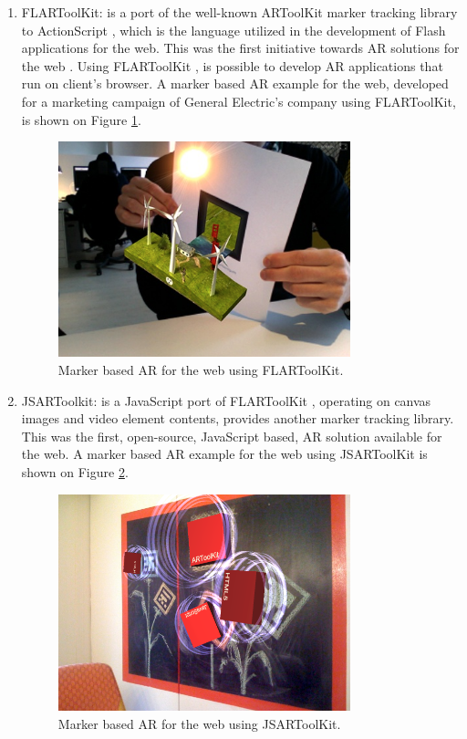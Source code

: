 \begin{enumerate}
    \item FLARToolKit: is a port of the well-known ARToolKit \cite{Hirokazu2002} marker tracking library to ActionScript \cite{Flash2013}, which is the language utilized in the development of Flash applications for the web. This was the first initiative towards AR solutions for the web \cite{Pablo2013}. Using FLARToolKit \cite{Yan2011}, is possible to develop AR applications that run on client's browser. A marker based AR example for the web, developed for a marketing campaign of General Electric's company using FLARToolKit, is shown on Figure \ref{figure:flartoolkit}.

    \begin{figure}[!htb]
      \centering
      \includegraphics[width=240pt]{chapters/tracking_library_for_the_web/flartoolkit.png}
      \caption{Marker based AR for the web using FLARToolKit.}
      \label{figure:flartoolkit}
    \end{figure}

    \item JSARToolkit: is a JavaScript \cite{International2009} port of FLARToolKit \cite{Yan2011}, operating on canvas images \cite{Canvas2013} and
video element \cite{Hickson2013} contents, provides another marker tracking library. This was the first, open-source, JavaScript based, AR solution available for the web. A marker based AR example for the web using JSARToolKit is shown on Figure \ref{figure:jsartoolkit}.

    \begin{figure}[!htb]
      \centering
      \includegraphics[width=240pt]{chapters/tracking_library_for_the_web/jsartoolkit.png}
      \caption{Marker based AR for the web using JSARToolKit.}
      \label{figure:jsartoolkit}
    \end{figure}


\end{enumerate}
